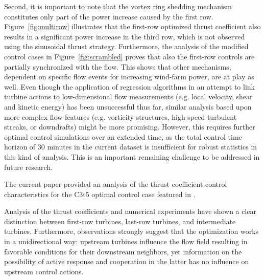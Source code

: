 \documentclass[wes, manuscript]{copernicus}
\begin{document}
Second, it is important to note that the vortex ring shedding mechanism constitutes only part of the power increase caused by the first row. Figure~\ref{fig:multirow} illustrates that the first-row optimized thrust coefficient also results in a significant power increase in the third row, which is not observed using the sinusoidal thrust strategy. Furthermore, the analysis of the modified control cases in Figure~\ref{fig:scrambled} proves that also the first-row controls are partially synchronized with the flow. This shows that other mechanisms, dependent on specific flow events for increasing wind-farm power, are at play as well. Even though the application of regression algorithms in an attempt to link turbine actions to low-dimensional flow measurements (e.g. local velocity, shear and kinetic energy) has been unsuccessful thus far, similar analysis based upon more complex flow features (e.g. vorticity structures, high-speed turbulent streaks, or downdrafts) might be more promising. However, this requires further optimal control simulations over an extended time, as the total control time horizon of 30 minutes in the current dataset is insufficient for robust statistics in this kind of analysis. This is an important remaining challenge to be addressed in future research. 

\conclusions \label{sec:analysis_summ}
The current paper provided an analysis of the thrust coefficient control characteristics for the C3t5 optimal control case featured in \cite{munters2017optimal}. 

Analysis of the thrust coefficients and numerical experiments have shown a clear distinction between first-row turbines, last-row turbines, and intermediate turbines. Furthermore, observations strongly suggest that the optimization works in a unidirectional way: upstream turbines influence the flow field resulting in favorable conditions for their downstream neighbors, yet information on the possibility of active response and cooperation in the latter has no influence on upstream control actions. 
\end{document}
